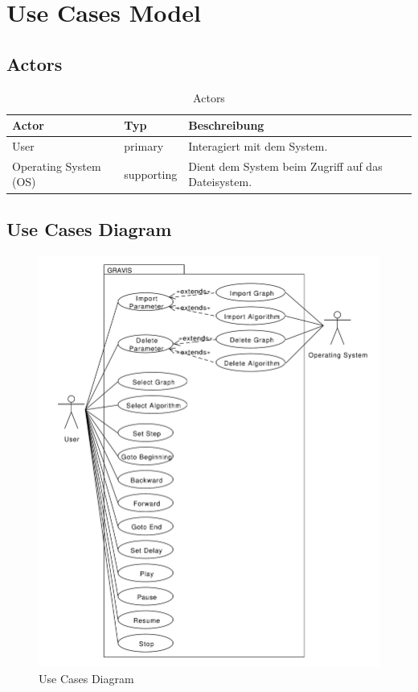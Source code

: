 \section{Use Cases Model}
\label{sec:Use Cases Model}
% 
\subsection{Actors}
\label{subsec:Actors}
\begin{table}[htp]
  \begin{tabular}[t]{|l|l|l|}\hline
	  \rowcolor{tcA}
	  Actor 			& Typ 		& Beschreibung \\\hline
	  User		 		& primary 	& Interagiert mit dem System. \\\hline
	  Operating System (OS) 	& supporting 	& Dient dem System beim Zugriff auf das Dateisystem. \\\hline
  \end{tabular}
  \caption{Actors}
  \label{tab:actors}
\end{table}

% 
\subsection{Use Cases Diagram}
\label{subsec:Use Cases Diagram}
\begin{figure}[H]
	\includegraphics[scale=0.5]{diagrams/use-cases-diagram.pdf}
    \caption{Use Cases Diagram}
    \label{fig:use_cases_diagram}
\end{figure}
% 
